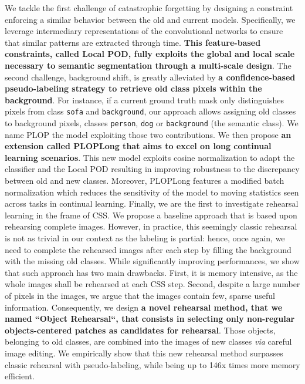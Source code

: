 We tackle the first challenge of catastrophic forgetting by designing a constraint enforcing a
similar behavior between the old and current models. Specifically, we leverage intermediary
representations of the convolutional networks to ensure that similar patterns are extracted through
time. \textbf{This feature-based constraints, called Local POD, fully exploits the global and local
    scale necessary to semantic segmentation through a multi-scale design}. The second challenge,
background shift, is greatly alleviated by \textbf{a confidence-based pseudo-labeling strategy to
    retrieve old class pixels within the background}. For instance, if a current ground truth mask only
distinguishes pixels from class \texttt{sofa} and \texttt{background}, our approach allows assigning old
classes to background pixels, \eg classes \texttt{person}, \texttt{dog} or \texttt{background} (the
semantic class). We name PLOP the model exploiting those two contributions. We then propose
\textbf{an extension called PLOPLong that aims to excel on long continual learning scenarios}. This
new model exploits cosine normalization to adapt the classifier and the Local POD resulting in
improving robustness to the discrepancy between old and new classes. Moreover, PLOPLong features a
modified batch normalization which reduces the sensitivity of the model to moving statistics seen
across tasks in continual learning. Finally, we are the first to investigate rehearsal learning in
the frame of \ac{CSS}. We propose a baseline approach that is based upon rehearsing complete images.
However, in practice, this seemingly classic rehearsal is not as trivial in our context as the
labeling is partial: hence, once again, we need to complete the rehearsed images after each step by
filling the background with the missing old classes. While significantly improving performances, we
show that such approach has two main drawbacks. First, it is memory intensive, as the whole images
shall be rehearsed at each \ac{CSS} step. Second, despite a large number of pixels in the images, we
argue that the images contain few, sparse useful information. Consequently, we design \textbf{a
    novel rehearsal method, that we named ``Object Rehearsal``, that consists in selecting only
    non-regular objects-centered patches as candidates for rehearsal}. Those objects, belonging to old
classes, are combined into the images of new classes \textit{via} careful image editing. We
empirically show that this new rehearsal method surpasses classic rehearsal with pseudo-labeling,
while being up to 146x times more memory efficient.

